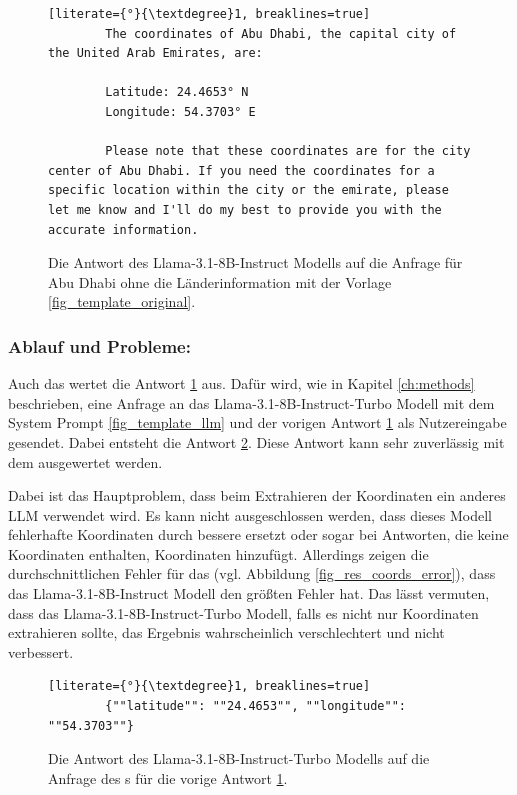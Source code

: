 \begin{figure} %

    \begin{lstlisting}[literate={°}{\textdegree}1, breaklines=true]
        The coordinates of Abu Dhabi, the capital city of the United Arab Emirates, are:

        Latitude: 24.4653° N
        Longitude: 54.3703° E

        Please note that these coordinates are for the city center of Abu Dhabi. If you need the coordinates for a specific location within the city or the emirate, please let me know and I'll do my best to provide you with the accurate information.
    \end{lstlisting}

    \caption{Die Antwort des Llama-3.1-8B-Instruct Modells auf die Anfrage für Abu Dhabi ohne die Länderinformation mit der Vorlage \ref{fig_template_original}.}

    \label{answer_original}
\end{figure}

\subsubsection*{Ablauf und Probleme: \llmv{}}
Auch das \llmv{} wertet die Antwort \ref{answer_original} aus.
Dafür wird, wie in Kapitel \ref{ch:methods} beschrieben, eine Anfrage an das Llama-3.1-8B-Instruct-Turbo Modell mit dem System Prompt \ref{fig_template_llm} und der vorigen Antwort \ref{answer_original} als Nutzereingabe gesendet.
Dabei entsteht die Antwort \ref{answer_llm}.
Diese Antwort kann sehr zuverlässig mit dem \jsonv{} ausgewertet werden.

Dabei ist das Hauptproblem, dass beim Extrahieren der Koordinaten ein anderes LLM verwendet wird.
Es kann nicht ausgeschlossen werden, dass dieses Modell fehlerhafte Koordinaten durch bessere ersetzt oder sogar bei Antworten, die keine Koordinaten enthalten, Koordinaten hinzufügt.
Allerdings zeigen die durchschnittlichen Fehler für das \llmv{} (vgl. Abbildung \ref{fig_res_coords_error}), dass das Llama-3.1-8B-Instruct Modell den größten Fehler hat.
Das lässt vermuten, dass das Llama-3.1-8B-Instruct-Turbo Modell, falls es nicht nur Koordinaten extrahieren sollte, das Ergebnis wahrscheinlich verschlechtert und nicht verbessert.

\begin{figure} %

    \begin{lstlisting}[literate={°}{\textdegree}1, breaklines=true]
        {""latitude"": ""24.4653"", ""longitude"": ""54.3703""}
    \end{lstlisting}

    \caption{Die Antwort des Llama-3.1-8B-Instruct-Turbo Modells auf die Anfrage des \llmv{}s für die vorige Antwort \ref{answer_original}.}

    \label{answer_llm}
\end{figure}

